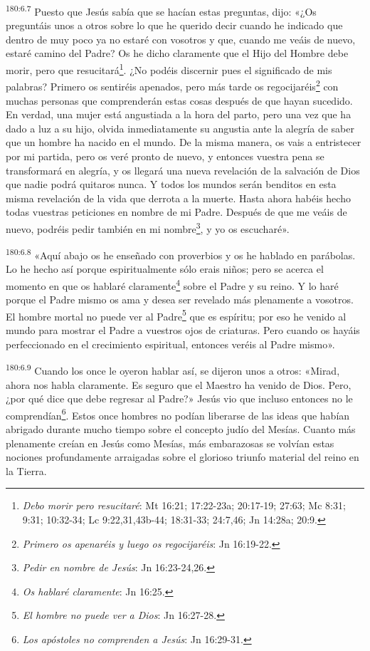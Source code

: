 \par 
\textsuperscript{180:6.7} Puesto que Jesús sabía que se hacían estas preguntas, dijo: «¿Os preguntáis unos a otros sobre lo que he querido decir cuando he indicado que dentro de muy poco ya no estaré con vosotros y que, cuando me veáis de nuevo, estaré camino del Padre? Os he dicho claramente que el Hijo del Hombre debe morir, pero que resucitará\footnote{\textit{Debo morir pero resucitaré}: Mt 16:21; 17:22-23a; 20:17-19; 27:63; Mc 8:31; 9:31; 10:32-34; Lc 9:22,31,43b-44; 18:31-33; 24:7,46; Jn 14:28a; 20:9.}. ¿No podéis discernir pues el significado de mis palabras? Primero os sentiréis apenados, pero más tarde os regocijaréis\footnote{\textit{Primero os apenaréis y luego os regocijaréis}: Jn 16:19-22.} con muchas personas que comprenderán estas cosas después de que hayan sucedido. En verdad, una mujer está angustiada a la hora del parto, pero una vez que ha dado a luz a su hijo, olvida inmediatamente su angustia ante la alegría de saber que un hombre ha nacido en el mundo. De la misma manera, os vais a entristecer por mi partida, pero os veré pronto de nuevo, y entonces vuestra pena se transformará en alegría, y os llegará una nueva revelación de la salvación de Dios que nadie podrá quitaros nunca. Y todos los mundos serán benditos en esta misma revelación de la vida que derrota a la muerte. Hasta ahora habéis hecho todas vuestras peticiones en nombre de mi Padre. Después de que me veáis de nuevo, podréis pedir también en mi nombre\footnote{\textit{Pedir en nombre de Jesús}: Jn 16:23-24,26.}, y yo os escucharé».

\par 
\textsuperscript{180:6.8} «Aquí abajo os he enseñado con proverbios y os he hablado en parábolas. Lo he hecho así porque espiritualmente sólo erais niños; pero se acerca el momento en que os hablaré claramente\footnote{\textit{Os hablaré claramente}: Jn 16:25.} sobre el Padre y su reino. Y lo haré porque el Padre mismo os ama y desea ser revelado más plenamente a vosotros. El hombre mortal no puede ver al Padre\footnote{\textit{El hombre no puede ver a Dios}: Jn 16:27-28.} que es espíritu; por eso he venido al mundo para mostrar el Padre a vuestros ojos de criaturas. Pero cuando os hayáis perfeccionado en el crecimiento espiritual, entonces veréis al Padre mismo».

\par 
\textsuperscript{180:6.9} Cuando los once le oyeron hablar así, se dijeron unos a otros: «Mirad, ahora nos habla claramente. Es seguro que el Maestro ha venido de Dios. Pero, ¿por qué dice que debe regresar al Padre?» Jesús vio que incluso entonces no le comprendían\footnote{\textit{Los apóstoles no comprenden a Jesús}: Jn 16:29-31.}. Estos once hombres no podían liberarse de las ideas que habían abrigado durante mucho tiempo sobre el concepto judío del Mesías. Cuanto más plenamente creían en Jesús como Mesías, más embarazosas se volvían estas nociones profundamente arraigadas sobre el glorioso triunfo material del reino en la Tierra.